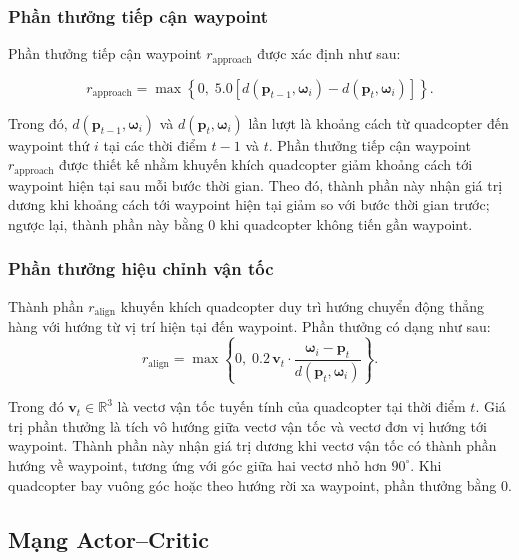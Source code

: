 \subsubsection{Phần thưởng tiếp cận waypoint}

Phần thưởng tiếp cận waypoint $r_{\mathrm{approach}}$ được xác định như sau:

\begin{equation}
 r_{\mathrm{approach}} = \max\left\{0,\;5.0\left[
 d(\mathbf{p}_{t-1}, \boldsymbol{\omega}_i)
 - d(\mathbf{p}_t, \boldsymbol{\omega}_i)
 \right]\right\}.
 \label{eq:progress-reward}
\end{equation}

Trong đó, $d(\mathbf{p}_{t-1}, \boldsymbol{\omega}_i)$ và $d(\mathbf{p}_t, \boldsymbol{\omega}_i)$ lần lượt là khoảng cách từ quadcopter đến waypoint thứ $i$ tại các thời điểm $t-1$ và $t$. Phần thưởng tiếp cận waypoint $r_{\mathrm{approach}}$ được thiết kế nhằm khuyến khích quadcopter giảm khoảng cách tới waypoint hiện tại sau mỗi bước thời gian. Theo đó, thành phần này nhận giá trị dương khi khoảng cách tới waypoint hiện tại giảm so với bước thời gian trước; ngược lại, thành phần này bằng $0$ khi quadcopter không tiến gần waypoint.

\subsubsection{Phần thưởng hiệu chỉnh vận tốc}

Thành phần $r_{\mathrm{align}}$ khuyến khích quadcopter duy trì hướng chuyển động thẳng hàng với hướng từ vị trí hiện tại đến waypoint. Phần thưởng có dạng như sau:
\begin{equation}
 r_{\mathrm{align}} = \max\left\{0,\;0.2\,\mathbf{v}_t \cdot
 \frac{\boldsymbol{\omega}_i - \mathbf{p}_t}
 {d(\mathbf{p}_t, \boldsymbol{\omega}_i)}\right\}.
 \label{eq:alignment-reward}
\end{equation}

Trong đó $\mathbf{v}_t \in \mathbb{R}^3$ là vectơ vận tốc tuyến tính của quadcopter tại thời điểm $t$. Giá trị phần thưởng là tích vô hướng giữa vectơ vận tốc và vectơ đơn vị hướng tới waypoint. Thành phần này nhận giá trị dương khi vectơ vận tốc có thành phần hướng về waypoint, tương ứng với góc giữa hai vectơ nhỏ hơn $90^\circ$. Khi quadcopter bay vuông góc hoặc theo hướng rời xa waypoint, phần thưởng bằng $0$.

\subsection{Mạng Actor--Critic}

